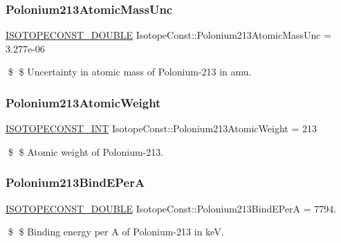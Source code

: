\subsubsection{\texorpdfstring{Polonium213\+Atomic\+Mass\+Unc}{Polonium213AtomicMassUnc}}
{\footnotesize\ttfamily \mbox{\hyperlink{group___isotope_const-_macros_ga8f45a7272ce02c0b4c65c44636ed719a}{I\+S\+O\+T\+O\+P\+E\+C\+O\+N\+S\+T\+\_\+\+D\+O\+U\+B\+LE}} Isotope\+Const\+::\+Polonium213\+Atomic\+Mass\+Unc = 3.\+277e-\/06}

\$ \$ Uncertainty in atomic mass of Polonium-\/213 in amu. \mbox{\label{group___isotope_const-_polonium-_po213_ga7eec133bd2674a81f28f175942de5055}} 
\subsubsection{\texorpdfstring{Polonium213\+Atomic\+Weight}{Polonium213AtomicWeight}}
{\footnotesize\ttfamily \mbox{\hyperlink{group___isotope_const-_macros_ga5f18360b3e99483a35c32d789e62621c}{I\+S\+O\+T\+O\+P\+E\+C\+O\+N\+S\+T\+\_\+\+I\+NT}} Isotope\+Const\+::\+Polonium213\+Atomic\+Weight = 213}

\$ \$ Atomic weight of Polonium-\/213. \mbox{\label{group___isotope_const-_polonium-_po213_gadd98d73e9dc2096d1752f89527fcded6}} 
\subsubsection{\texorpdfstring{Polonium213\+Bind\+E\+PerA}{Polonium213BindEPerA}}
{\footnotesize\ttfamily \mbox{\hyperlink{group___isotope_const-_macros_ga8f45a7272ce02c0b4c65c44636ed719a}{I\+S\+O\+T\+O\+P\+E\+C\+O\+N\+S\+T\+\_\+\+D\+O\+U\+B\+LE}} Isotope\+Const\+::\+Polonium213\+Bind\+E\+PerA = 7794.}

\$ \$ Binding energy per A of Polonium-\/213 in keV. \mbox{\label{group___isotope_const-_polonium-_po213_ga17538201b360d711a358ad75ff0876ad}} 
